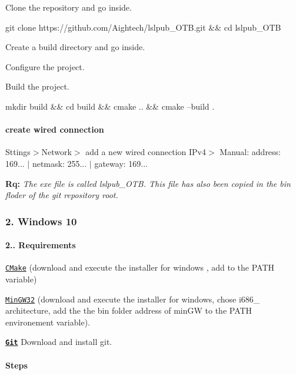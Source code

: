 \begin{DoxyItemize}
\item Clone the repository and go inside. 
\begin{DoxyCode}
git clone https://github.com/Aightech/lslpub\_OTB.git && cd lslpub\_OTB
\end{DoxyCode}

\item Create a build directory and go inside.
\item Configure the project.
\item Build the project. 
\begin{DoxyCode}
mkdir build && cd build && cmake .. && cmake --build .
\end{DoxyCode}
 \paragraph*{create wired connection}
\end{DoxyItemize}

Sttings$>$Network$>$ add a new wired connection I\+Pv4$>$ Manual\+: address\+: 169... $\vert$ netmask\+: 255... $\vert$ gateway\+: 169...

{\bfseries Rq\+:} {\itshape The exe file is called lslpub\+\_\+\+O\+TB. This file has also been copied in the bin floder of the git repository root.}

\subsubsection*{2. Windows 10}

\paragraph*{2.. {\bfseries Requirements}}


\begin{DoxyItemize}
\item \href{https://cmake.org/download/}{\tt C\+Make} (download and execute the installer for windows , add to the P\+A\+TH variable)
\item \href{https://sourceforge.net/projects/mingw-w64/}{\tt Min\+G\+W32} (download and execute the installer for windows, chose i686\+\_ architecture, add the the bin folder address of min\+GW to the P\+A\+TH environement variable).
\item \href{https://git-for-windows.github.io/}{\tt {\bfseries Git}} Download and install git. \paragraph*{Steps}
\end{DoxyItemize}


